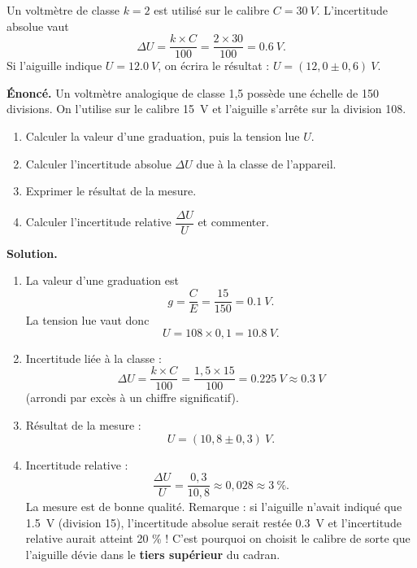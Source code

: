 \documentclass[11pt]{article}
\begin{document}
\begin{exemplebox}
Un voltmètre de classe $k = 2$ est utilisé sur le calibre $C = \SI{30}{V}$. L'incertitude absolue vaut
\[ \Delta U = \frac{k \times C}{100} = \frac{2 \times 30}{100} = \SI{0,6}{V}. \]
Si l'aiguille indique $U = \SI{12,0}{V}$, on écrira le résultat : $U = (12{,}0 \pm 0{,}6)\ \si{V}$.
\end{exemplebox}

\begin{exoresolu}
\textbf{Énoncé.} Un voltmètre analogique de classe 1,5 possède une échelle de 150 divisions. On l'utilise sur le calibre \SI{15}{V} et l'aiguille s'arrête sur la division 108.
\begin{enumerate}
\item Calculer la valeur d'une graduation, puis la tension lue $U$.
\item Calculer l'incertitude absolue $\Delta U$ due à la classe de l'appareil.
\item Exprimer le résultat de la mesure.
\item Calculer l'incertitude relative $\dfrac{\Delta U}{U}$ et commenter.
\end{enumerate}
\tcblower
\textbf{Solution.}
\begin{enumerate}
\item La valeur d'une graduation est
\[ g = \frac{C}{E} = \frac{15}{150} = \SI{0,1}{V}. \]
La tension lue vaut donc
\[ U = 108 \times 0{,}1 = \SI{10,8}{V}. \]
\item Incertitude liée à la classe :
\[ \Delta U = \frac{k \times C}{100} = \frac{1{,}5 \times 15}{100} = \SI{0,225}{V} \approx \SI{0,3}{V} \]
(arrondi par excès à un chiffre significatif).
\item Résultat de la mesure :
\[ U = (10{,}8 \pm 0{,}3)\ \si{V}. \]
\item Incertitude relative :
\[ \frac{\Delta U}{U} = \frac{0{,}3}{10{,}8} \approx 0{,}028 \approx 3\ \%. \]
La mesure est de bonne qualité. Remarque : si l'aiguille n'avait indiqué que \SI{1,5}{V} (division 15), l'incertitude absolue serait restée \SI{0,3}{V} et l'incertitude relative aurait atteint 20 \% ! C'est pourquoi on choisit le calibre de sorte que l'aiguille dévie dans le \textbf{tiers supérieur} du cadran.
\end{enumerate}
\end{exoresolu}
\end{document}
